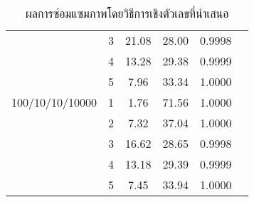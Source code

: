 \begin{table}[H]
{\begin{tabular}[ht]{|l|c|c|c|c|c|}
        & 3 & 21.08 & 28.00 & 0.9998 \\
        & 4 & 13.28 & 29.38 & 0.9999 \\
        & 5 & 7.96 & 33.34 & 1.0000\\
        \hline
        100/10/10/10000  & 1 & 1.76 & 71.56 & 1.0000 \\
        & 2 & 7.32 & 37.04 & 1.0000\\
        & 3 & 16.62 & 28.65 & 0.9998 \\
        & 4 & 13.18 & 29.39 & 0.9999\\
        & 5 & 7.45 & 33.94 & 1.0000 \\
        \hline
    \end{tabular}
    }
    \caption{ผลการซ่อมแซมภาพโดยวิธีการเชิงตัวเลขที่นำเสนอ}
    \label{table:multiresolution}
\end{table}	